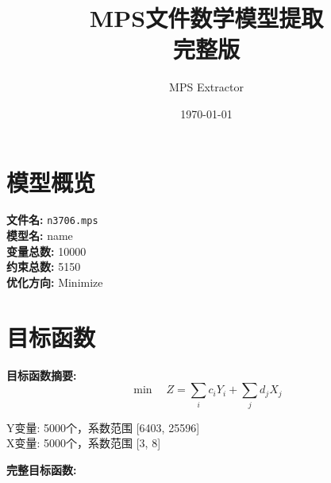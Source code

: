 \documentclass[a4paper,10pt]{article}
\title{MPS文件数学模型提取\\{\large 完整版}}
\author{MPS Extractor}
\date{\today}
\begin{document}
\maketitle
\tableofcontents
\newpage

\section{模型概览}

\textbf{文件名:} \texttt{n3706.mps} \\
\textbf{模型名:} name \\
\textbf{变量总数:} 10000 \\
\textbf{约束总数:} 5150 \\
\textbf{优化方向:} Minimize \\

\section{目标函数}

\textbf{目标函数摘要:}
\begin{equation}
\min \quad Z = \sum_{i} c_i Y_i + \sum_{j} d_j X_j
\end{equation}

Y变量: 5000个，系数范围 [6403, 25596] \\
X变量: 5000个，系数范围 [3, 8]

\textbf{完整目标函数:}
\end{document}
